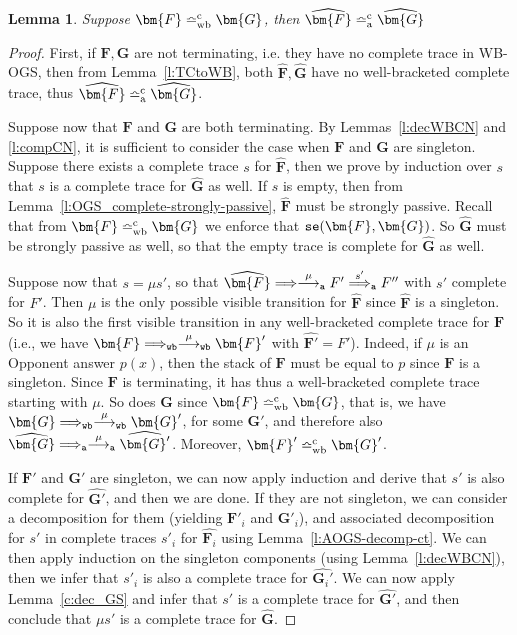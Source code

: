 \documentclass[11pt,a4paper]{amsart}
\theoremstyle{plain}
\theoremstyle{definition}
\theoremstyle{defC}
\theoremstyle{thmC}
\theoremstyle{plain}
\numberwithin{equation}{section}
\def\finish#1{\vskip.2cm\noindent{\em #1}%
  \marginpar{$\longleftarrow$}\vskip.2cm}
\newcommand{\finish}[1]{}
\newcommand{\tr}{s}
\newcommand{\stt}{\sigma}
\newcommand{\sttp}{\sigma'}
\newcommand{\WBOGS}{\mbox{{\rm WB-OGS}}\xspace}      %
\newcommand{\okC}[2]{{\tt se}(#1,#2)}  %
\newcommand{\rmm}[1]{{\tt{\lowercase{#1}}}}
\newcommand{\genarr}[2]{\mathrel{\stackrel{{#1}}{\longrightarrow}_{\rmm{\lowercase{#2}}}}}
\newcommand{\genArr}[2]{\mathrel{\stackrel{{#1}}{\Longrightarrow}_{\rmm{\lowercase{#2}}}}}  %
\newcommand{\arrA}[1]{\genarr{#1}{A}}  %
\newcommand{\ArrA}[1]{\genArr{#1}{A}}  %
\newcommand{\arrWB}[1]{\genarr{#1}{WB}}           %
\newcommand{\ArrWB}[1]{\genArr{#1}{WB}}          %
\newcommand{\genTEcomp}[1]{\mathrel{\bumpeq^{\rm c}_{\rm{\lowercase{#1}}}}} %
\newcommand{\TEwbc}{\genTEcomp{WB}}       %
\newcommand{\TEc}{\genTEcomp{A}}        %
\newcommand{\FF}{F}
\newcommand{\GG}{G}
\newcommand{\FFb}{{\bm{\FF}}} %
\newcommand{\GGb}{{\bm{\GG}}} %
\newcommand{\es}{\eraseStack}
\newcommand{\act}{\mu}
\newcommand{\ansO}[2]{#1(#2)}
\newcommand{\eraseStack}[1]{\widehat{#1}}
\theoremstyle{plain}
\newtheorem{lemma}[thm]{Lemma}
\theoremstyle{definition}
\begin{document}
\begin{lemma}
\label{l:mainWBCN}
Suppose 
$\FFb \TEwbc \GGb$,
then
$\es\FFb \TEc \es\GGb$
\end{lemma}              

\begin{proof}
First, if $\FFb,\GGb$ are not terminating, i.e. they have no complete trace in \WBOGS, 
then from Lemma~\ref{l:TCtoWB}, both 
$\es{\FFb},\es{\GGb}$ have no well-bracketed complete trace, thus
$\es\FFb \TEc \es\GGb$. 

Suppose now that $\FFb$ and $\GGb$ are both terminating.
By Lemmas~\ref{l:decWBCN} and \ref{l:compCN}, it is sufficient to consider 
the case when $\FFb$ and $\GGb$ are singleton. 
%
Suppose there exists a complete trace $\tr$ for $\es{\FFb}$, 
then we prove by induction over $\tr$
that $\tr$ is a complete trace for $\es{\GGb}$ as well.
If $\tr$ is empty, then from Lemma~\ref{l:OGS_complete-strongly-passive},
$\es{\FFb}$ must be strongly passive.
Recall that from $\FFb \TEwbc \GGb$ we enforce that
$\okC{\FFb}{\GGb}$.
So $\es{\GGb}$ must be strongly passive as well, so that 
the empty trace is complete for $\es{\GGb}$ as well.

Suppose now that 
$\tr = \act \tr'$, so that
$\es\FFb \Longrightarrow \arrA {\act} \FF' \ArrA{\tr'} \FF''$
with $\tr'$ complete for $\FF'$.
Then $\act$ is the only possible visible transition for $\es\FFb$ 
since $\es\FFb$ is a singleton.
So it is also the first
visible transition in any well-bracketed complete trace for $\FFb$ (i.e., we have 
$\FFb \ArrWB{} \arrWB{\act} \FFb'$ with $\es{\FFb'} = \FF'$). 
Indeed, if $\act$ is an Opponent answer $\ansO{p}{x}$, then the stack
of $\FFb$ must be equal to $p$ since $\FFb$ is a singleton.
Since $\FFb$ is terminating, it has thus a well-bracketed complete
trace starting with $\act$.
%
So does $\GGb$ since 
$\FFb  \TEwbc \GGb$, that is, we have  
$\GGb \ArrWB{} \arrWB{\act} \GGb'$, for some $\GGb'$, and therefore also 
$\es\GGb \ArrA{} \arrA{\act} \es{\GGb'}$. 
% 
Moreover, $\FFb'  \TEwbc \GGb'$.
% 

If $\FFb'$ and $\GGb'$ are singleton, we can now apply induction and 
derive that $\tr'$ is also complete for $\es{\GGb'}$, and then we are done. 
%
If they are not singleton, we can consider a decomposition for them 
(yielding $\FFb'_i$ and $\GGb'_i$), and associated decomposition
for $\tr'$ in complete traces $\tr'_i$ for $\es{\FFb_i}$ using Lemma~\ref{l:AOGS-decomp-ct}. 
We can then apply induction on the singleton components (using
Lemma~\ref{l:decWBCN}), then we infer that 
$\tr'_i$ is also a complete trace for $\es{\GGb_i'}$. 
We can now apply Lemma~\ref{c:dec_GS} and infer that $\tr'$ is a complete trace for $\es{\GGb'}$,
and then conclude that $\act\tr'$ is a complete trace for $\es\GGb$.
\end{proof} 
\end{document}
